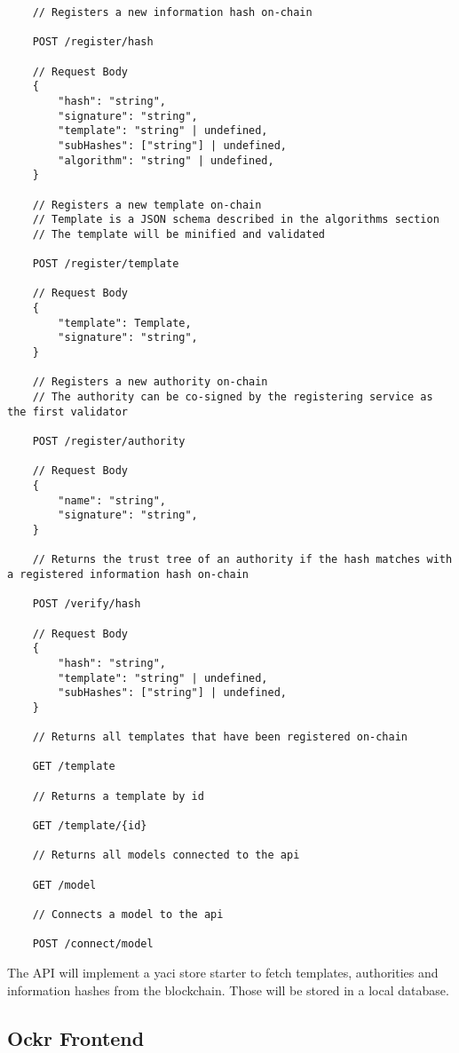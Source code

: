 \documentclass[../ockr-specification.tex]{subfiles}
\begin{document}
\begin{lstlisting}
    // Registers a new information hash on-chain

    POST /register/hash

    // Request Body
    {
        "hash": "string",
        "signature": "string",
        "template": "string" | undefined,
        "subHashes": ["string"] | undefined,
        "algorithm": "string" | undefined,
    }

    // Registers a new template on-chain
    // Template is a JSON schema described in the algorithms section
    // The template will be minified and validated 

    POST /register/template

    // Request Body
    {
        "template": Template,
        "signature": "string",
    }

    // Registers a new authority on-chain
    // The authority can be co-signed by the registering service as the first validator

    POST /register/authority

    // Request Body
    {
        "name": "string",
        "signature": "string",
    }

    // Returns the trust tree of an authority if the hash matches with a registered information hash on-chain

    POST /verify/hash

    // Request Body
    {
        "hash": "string",
        "template": "string" | undefined,
        "subHashes": ["string"] | undefined,
    }

    // Returns all templates that have been registered on-chain

    GET /template

    // Returns a template by id

    GET /template/{id}

    // Returns all models connected to the api

    GET /model

    // Connects a model to the api

    POST /connect/model

\end{lstlisting}

The API will implement a yaci store starter to fetch templates, authorities and information hashes from the blockchain. Those will be stored in a local database.

\subsection{Ockr Frontend}
\end{document}
